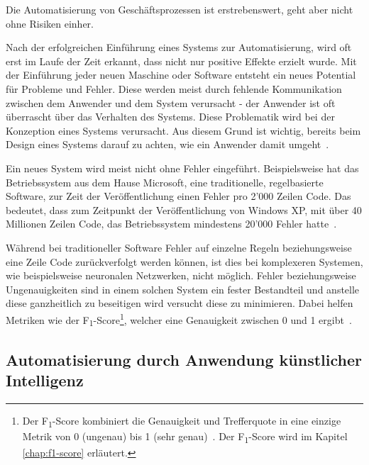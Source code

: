 Die Automatisierung von Geschäftsprozessen ist erstrebenswert, geht aber nicht ohne Risiken einher.


Nach der erfolgreichen Einführung eines Systems zur Automatisierung, wird oft erst im Laufe der Zeit erkannt, dass nicht nur positive Effekte erzielt wurde. Mit der Einführung jeder neuen Maschine oder Software entsteht ein neues Potential für Probleme und Fehler. Diese werden meist durch fehlende Kommunikation zwischen dem Anwender und dem System verursacht - der Anwender ist oft überrascht über das Verhalten des Systems. Diese Problematik wird bei der Konzeption eines Systems verursacht. Aus diesem Grund ist wichtig, bereits beim Design eines Systems darauf zu achten, wie ein Anwender damit umgeht~\autocite{Sarter1997}. 

Ein neues System wird meist nicht ohne Fehler eingeführt. Beispielsweise hat das Betriebssystem aus dem Hause Microsoft, eine traditionelle, regelbasierte Software, zur Zeit der Veröffentlichung einen Fehler pro 2'000 Zeilen Code. Das bedeutet, dass zum Zeitpunkt der Veröffentlichung von Windows XP, mit über 40 Millionen Zeilen Code, das Betriebssystem mindestens 20'000 Fehler hatte~\autocite{TheEconomist2010}. 

Während bei traditioneller Software Fehler auf einzelne Regeln beziehungsweise eine Zeile Code zurückverfolgt werden können, ist dies bei komplexeren Systemen, wie beispielsweise neuronalen Netzwerken, nicht möglich. Fehler beziehungsweise Ungenauigkeiten sind in einem solchen System ein fester Bestandteil und anstelle diese ganzheitlich zu beseitigen wird versucht diese zu minimieren. Dabei helfen Metriken wie der F\textsubscript{1}-Score\footnote{Der F\textsubscript{1}-Score kombiniert die Genauigkeit und Trefferquote in eine einzige Metrik von 0 (ungenau) bis 1 (sehr genau)~\autocite{VanRijsbergen1979}. Der F\textsubscript{1}-Score wird im Kapitel \ref{chap:f1-score} erläutert.}, welcher eine Genauigkeit zwischen 0 und 1 ergibt~\autocite{VanRijsbergen1979}.

\subsection{Automatisierung durch Anwendung künstlicher Intelligenz}

